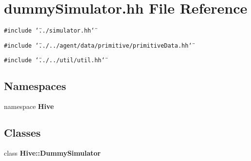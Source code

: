 \section{dummySimulator.hh File Reference}
\label{dummySimulator_8hh}


{\tt \#include \char`\"{}../simulator.hh\char`\"{}}\par
{\tt \#include \char`\"{}../../agent/data/primitive/primitiveData.hh\char`\"{}}\par
{\tt \#include \char`\"{}../../util/util.hh\char`\"{}}\par
\subsection*{Namespaces}
\begin{CompactItemize}
\item 
namespace {\bf Hive}
\end{CompactItemize}
\subsection*{Classes}
\begin{CompactItemize}
\item 
class {\bf Hive::DummySimulator}
\end{CompactItemize}
